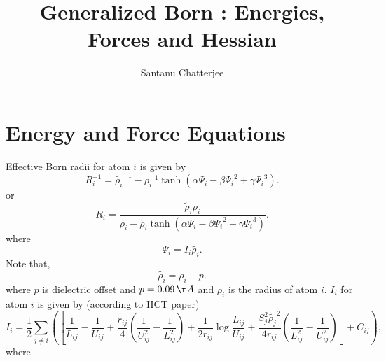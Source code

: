 \documentclass[12pt]{article}
\title{Generalized Born : Energies, Forces and Hessian}
\author{Santanu Chatterjee}
\date{}
\begin{document}
\maketitle

\section{Energy and Force Equations}

Effective Born radii for atom $i$ is given by
\begin{equation}
R_{i}^{-1} = \tilde{{\rho}_i}^{-1} - {\rho}_{i}^{-1}\tanh({\alpha}{\Psi_{i}}-{\beta}{\Psi_{i}}^{2} + {\gamma}{\Psi_{i}}^{3}).
\end{equation}
or
\begin{equation}
R_{i} = \frac{\tilde{\rho}_{i}{\rho}_{i}}{{\rho}_{i} - \tilde{\rho}_{i}\tanh({\alpha}{\Psi_{i}}-{\beta}{\Psi_{i}}^{2} + {\gamma}{\Psi_{i}}^{3})}.
\end{equation}
where 
\begin{equation}
\label{psiequation}
{\Psi}_{i} = I_{i}\tilde{{\rho}_i}.
\end{equation}
Note that, 
\begin{equation}
\tilde{{\rho}_i} = {\rho}_{i} - p.
\end{equation}
where $p$ is dielectric offset and $p=0.09{\,}\AA$ and ${\rho}_{i}$ is the
radius of atom $i$.
$I_{i}$ for atom $i$ is given by (according to HCT paper) 
\begin{equation}
\label{burialterm}
I_{i} = \frac{1}{2}\displaystyle\sum_{j\ne i}\left(\left[\frac{1}{L_{ij}} - \frac{1}{U_{ij}} + \frac{r_{ij}}{4}\left(
  \frac{1}{U_{ij}^{2}} - \frac{1}{L_{ij}^{2}}\right) + \frac{1}{2r_{ij}}\log{\frac{L_{ij}}{U_{ij}}} + 
   \frac{S_{j}^{2}\tilde{{\rho}_{j}}^{2}}{4r_{ij}}\left(\frac{1}{L_{ij}^{2}} - \frac{1}{U_{ij}^{2}}\right)\right] + C_{ij}\right),
\end{equation}
where
\end{document}

